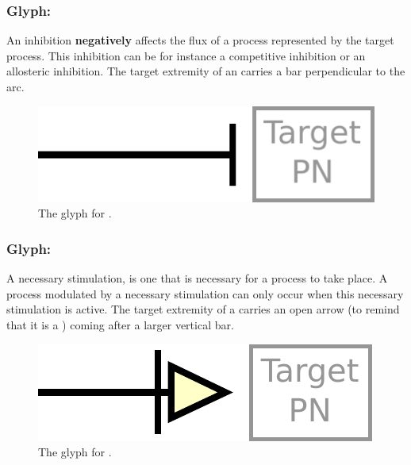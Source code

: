 
\subsubsection{Glyph: }\label{sec:inhibition}

An inhibition \textbf{negatively} affects the flux of a process represented by the target process. This inhibition can be for instance a competitive inhibition or an allosteric inhibition. The target extremity of an  carries a bar perpendicular to the arc.

\begin{figure}[H]
  \centering
  \includegraphics[scale = 0.5]{le_images/inhibition}
  \caption{The \PD glyph for .}
  \label{fig:inhibition}
\end{figure}





\subsubsection{Glyph: }\label{sec:necessary_stim}

A necessary stimulation, is one that is necessary for a process to take place. A process modulated by a necessary stimulation can only occur when this necessary stimulation is active. The target extremity of a  carries an open arrow (to remind that it is a ) coming after a larger vertical bar.

\begin{figure}[H]
  \centering
  \includegraphics[scale = 0.5]{le_images/necessary_stim}
  \caption{The \PD glyph for .}
  \label{fig:Necessary Stimulation}
\end{figure}


